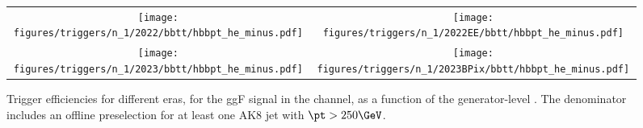 
    \begin{figure}[H]
        \centering
        \begin{tabular}{cc}
            \texttt{[image: figures/triggers/n\_1/2022/bbtt/hbbpt\_he\_minus.pdf]} &
            \texttt{[image: figures/triggers/n\_1/2022EE/bbtt/hbbpt\_he\_minus.pdf]} \\[1ex]
            \texttt{[image: figures/triggers/n\_1/2023/bbtt/hbbpt\_he\_minus.pdf]} &
            \texttt{[image: figures/triggers/n\_1/2023BPix/bbtt/hbbpt\_he\_minus.pdf]}
            \label{fig}
        \end{tabular}
\caption{Trigger efficiencies for different eras, for the ggF \HHbbtt signal in the \tauhe channel, as a function of the generator-level \hbb \pt. The denominator includes an offline preselection for at least one AK8 jet with $\pt > 250\GeV$.}
\label{fig:triggers_n-1_bbtt_he_hbbpt}
\end{figure}
